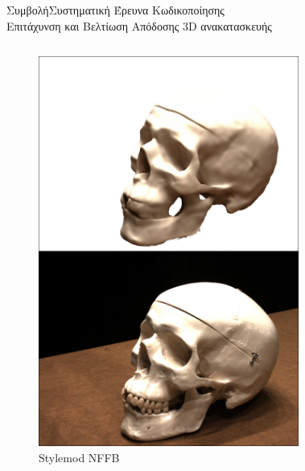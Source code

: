 \documentclass[10pt]{beamer}
\begin{document}
\begin{frame}{Συμβολή}{Συστηματική Έρευνα Κωδικοποίησης \\ Επιτάχυνση και Βελτίωση Απόδοσης 3D ανακατασκευής}
{\begin{columns}
\begin{figure}
                \includegraphics[height=.42\textheight]{images/RenderComparison65/Stylemodnffb/rendering_100.jpg}
                \caption{\tiny{Stylemod NFFB}}
                \label{fig:enter-label}
            \end{figure}
            \begin{figure}
                \centering

\end{figure}
\end{columns}}
\end{frame}
\end{document}
